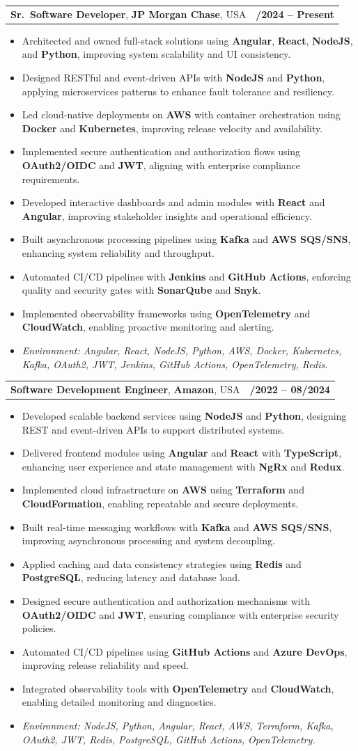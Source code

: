 \documentclass[letterpaper,11pt]{article}
\makeatletter
\newcommand{\resumeItem}[1]{
  \item\footnotesize{
    {#1 \vspace{-2pt}}
  }
}
\newcommand{\resumeSubheading}[4]{
  \vspace{-2pt}\item
    \begin{tabular*}{1.0\textwidth}[t]{l@{\extracolsep{\fill}}r}
      \textbf{\fontsize{10pt}{14pt}\selectfont #3}, \textbf{\fontsize{10pt}{14pt}\selectfont #1}, \fontsize{10pt}{14pt}\selectfont #4 & \textbf{\fontsize{10pt}{14pt}\selectfont #2} \\
    \end{tabular*}\vspace{-7pt}
}
\newcommand{\resumeItemListStart}{\begin{itemize}[leftmargin=*]}
\newcommand{\resumeItemListEnd}{\end{itemize}\vspace{-5pt}}
\makeatother
\begin{document}
\resumeSubheading
{JP Morgan Chase}{09/2024 -- Present}
{Sr.\ Software Developer}{USA}
\resumeItemListStart
  \resumeItem{Architected and owned full-stack solutions using \textbf{Angular}, \textbf{React}, \textbf{NodeJS}, and \textbf{Python}, improving system scalability and UI consistency.}
  \resumeItem{Designed RESTful and event-driven APIs with \textbf{NodeJS} and \textbf{Python}, applying microservices patterns to enhance fault tolerance and resiliency.}
  \resumeItem{Led cloud-native deployments on \textbf{AWS} with container orchestration using \textbf{Docker} and \textbf{Kubernetes}, improving release velocity and availability.}
  \resumeItem{Implemented secure authentication and authorization flows using \textbf{OAuth2/OIDC} and \textbf{JWT}, aligning with enterprise compliance requirements.}
  \resumeItem{Developed interactive dashboards and admin modules with \textbf{React} and \textbf{Angular}, improving stakeholder insights and operational efficiency.}
  \resumeItem{Built asynchronous processing pipelines using \textbf{Kafka} and \textbf{AWS SQS/SNS}, enhancing system reliability and throughput.}
  \resumeItem{Automated CI/CD pipelines with \textbf{Jenkins} and \textbf{GitHub Actions}, enforcing quality and security gates with \textbf{SonarQube} and \textbf{Snyk}.}
  \resumeItem{Implemented observability frameworks using \textbf{OpenTelemetry} and \textbf{CloudWatch}, enabling proactive monitoring and alerting.}
  \resumeItem{\textit{Environment: Angular, React, NodeJS, Python, AWS, Docker, Kubernetes, Kafka, OAuth2, JWT, Jenkins, GitHub Actions, OpenTelemetry, Redis.}}
\resumeItemListEnd

\resumeSubheading
{Amazon}{10/2022 -- 08/2024}
{Software Development Engineer}{USA}
\resumeItemListStart
  \resumeItem{Developed scalable backend services using \textbf{NodeJS} and \textbf{Python}, designing REST and event-driven APIs to support distributed systems.}
  \resumeItem{Delivered frontend modules using \textbf{Angular} and \textbf{React} with \textbf{TypeScript}, enhancing user experience and state management with \textbf{NgRx} and \textbf{Redux}.}
  \resumeItem{Implemented cloud infrastructure on \textbf{AWS} using \textbf{Terraform} and \textbf{CloudFormation}, enabling repeatable and secure deployments.}
  \resumeItem{Built real-time messaging workflows with \textbf{Kafka} and \textbf{AWS SQS/SNS}, improving asynchronous processing and system decoupling.}
  \resumeItem{Applied caching and data consistency strategies using \textbf{Redis} and \textbf{PostgreSQL}, reducing latency and database load.}
  \resumeItem{Designed secure authentication and authorization mechanisms with \textbf{OAuth2/OIDC} and \textbf{JWT}, ensuring compliance with enterprise security policies.}
  \resumeItem{Automated CI/CD pipelines using \textbf{GitHub Actions} and \textbf{Azure DevOps}, improving release reliability and speed.}
  \resumeItem{Integrated observability tools with \textbf{OpenTelemetry} and \textbf{CloudWatch}, enabling detailed monitoring and diagnostics.}
  \resumeItem{\textit{Environment: NodeJS, Python, Angular, React, AWS, Terraform, Kafka, OAuth2, JWT, Redis, PostgreSQL, GitHub Actions, OpenTelemetry.}}
\resumeItemListEnd
\end{document}
